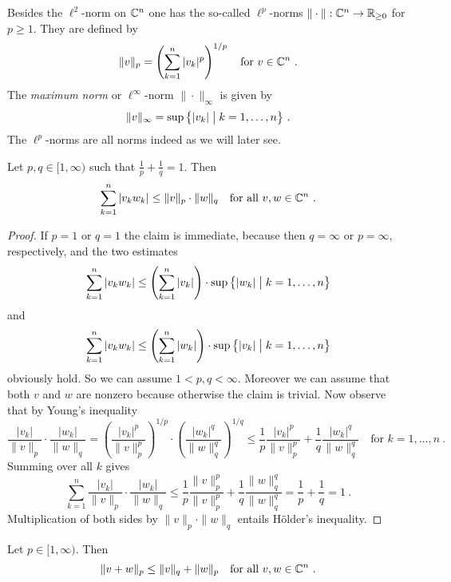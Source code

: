 \para
Besides the $\ell^2$-norm on $\mathbb{C}^n$ one has the so-called $\ell^p$-norms 
$\| \cdot \| : \mathbb{C}^n \to \mathbb{R}_{\geq 0}$ for $p \geq 1$. 
They are defined by 
\[
  \| v \|_p = \left( \sum_{k=1}^n |v_k|^p \right)^{1/p} \quad \text{for } v \in \C^n  \ . 
\] 
The \emph{maximum norm} or $\ell^\infty$-norm $\| \cdot \|_\infty$ is given by 
\[
  \| v \|_\infty = \sup \big\{ |v_k| \bigm\vert k = 1,\ldots , n \big\}  \ .
\]
The $\ell^p$-norms are all norms indeed as we will later see. 
\begin{theorem}
Let $p,q \in [1, \infty )$ such that $\frac 1p + \frac 1q =1$. Then 
\[
   \sum_{k=1}^n | v_k w_k | \leq  \| v \|_p \cdot \| w\|_q \quad \text{for all } v,w\in \mathbb{C}^n \ .
\]
\end{theorem}
\begin{proof}
If $p=1$ or $q=1$ the claim is immediate, because then $q=\infty$  or $p=\infty$, respectively,
and  the two estimates
\[
  \sum_{k=1}^n | v_k w_k | \leq  \left( \sum_{k=1}^n | v_k | \right) \cdot 
  \sup\big\{ |w_k| \bigm\vert k = 1,\ldots , n \big\} 
\]
and
\[
  \sum_{k=1}^n | v_k w_k | \leq  \left( \sum_{k=1}^n | w_k | \right) \cdot 
  \sup \big\{ |v_k| \bigm\vert k = 1,\ldots , n \big\} 
\]
obviously hold. So we can assume $1 < p,q < \infty$. Moreover we can assume that both $v$ and $w$ 
are nonzero because otherwise the claim is trivial. Now observe that by Young's inequality
\[
  \frac{|v_k|}{\| v \|_p} \cdot \frac{|w_k|}{\| w \|_q} =
  \left(\frac{|v_k|^p}{\| v \|_p^p} \right)^{1/p} \cdot \left(\frac{|w_k|^q}{\| w \|_q^q} \right)^{1/q}
  \leq \frac 1p \frac{|v_k|^p}{\| v \|_p^p} + \frac 1q \frac{|w_k|^q}{\| w \|_q^q} \quad 
  \text{for } k=1,\ldots , n\ .
\]
Summing over all $k$ gives
\[
   \sum_{k=1}^n \frac{|v_k|}{\| v \|_p} \cdot \frac{|w_k|}{\| w \|_q} \leq 
   \frac 1p  \frac{\|v\|_p^p}{\| v \|_p^p} + \frac 1q \frac{\|w\|_q^q}{\| w \|_q^q} = 
   \frac 1p + \frac 1q = 1 \ .
\]
Multiplication of both sides by $ \| v \|_p \cdot \| w\|_q$ entails H\"older's inequality.
\end{proof}

\begin{theorem}
Let $p  \in [1, \infty )$. Then
\[
   \| v + w \|_p \leq \| v\|_q + \| w \|_p \quad \text{for all } v,w\in \mathbb{C}^n \ .
\] 
\end{theorem}


